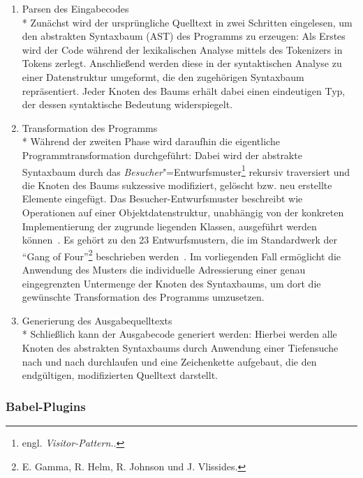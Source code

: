 \begin{enumerate}
  \item {\libertineSB Parsen des Eingabecodes}\\*
    Zunächst wird der ursprüngliche Quelltext in zwei Schritten eingelesen, um den abstrakten Syntaxbaum (AST) des Programms zu erzeugen: Als Erstes wird der Code während der lexikalischen Analyse mittels des Tokenizers in Tokens zerlegt. Anschließend werden diese in der syntaktischen Analyse zu einer Datenstruktur umgeformt, die den zugehörigen Syntaxbaum repräsentiert. Jeder Knoten des Baums erhält dabei einen eindeutigen Typ, der dessen syntaktische Bedeutung widerspiegelt.
    \\

  \item {\libertineSB Transformation des Programms}\\*
    Während der zweiten Phase wird daraufhin die eigentliche Programmtransformation durchgeführt: Dabei wird der abstrakte Syntaxbaum durch das \emph{Besucher}"=Entwurfsmuster\footnote{engl. \textit{Visitor-Pattern.}.} rekursiv traversiert und die Knoten des Baums sukzessive modifiziert, gelöscht bzw. neu erstellte Elemente eingefügt. Das Besucher-Entwurfsmuster beschreibt wie Operationen auf einer Objektdatenstruktur, unabhängig von der konkreten Implementierung der zugrunde liegenden Klassen, ausgeführt werden können~\autocite[634\psq]{FREEMAN:2004}. Es gehört zu den 23 Entwurfsmustern, die im Standardwerk  der \enquote{Gang of Four}\footnote{E. Gamma, R. Helm, R. Johnson und J. Vlissides.} beschrieben werden~\autocite[306\psqq]{GAMMA:1994}. Im vorliegenden Fall ermöglicht die Anwendung des Musters die individuelle Adressierung einer genau eingegrenzten Untermenge der Knoten des Syntaxbaums, um dort die gewünschte Transformation des Programms umzusetzen.
    \\

  \item {\libertineSB Generierung des Ausgabequelltexts}\\*
    Schließlich kann der Ausgabecode generiert werden: Hierbei werden alle Knoten des abstrakten Syntaxbaums durch Anwendung einer Tiefensuche nach und nach durchlaufen und eine Zeichenkette aufgebaut, die den endgültigen, modifizierten Quelltext darstellt.
\end{enumerate}

\subsubsection{Babel-Plugins}
\label{subsec:babel-plugins}

